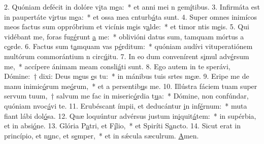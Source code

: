 2. Quóniam defécit in dolóre v\uline{i}ta m\uline{e}a:~* et anni mei n gem\uline{í}tibus.
3. Infirmáta est in paupertáte v\uline{i}rtus m\uline{e}a:~* et ossa mea cnturb\uline{á}ta sunt.
4. Super omnes inimícos meos factus sum oppróbrium et vicínis m\uline{e}is v\uline{a}lde:~* et timor ntis m\uline{e}is.
5. Qui vidébant me, foras fug\uline{é}runt \uline{a} me:~* oblivióni datus sum, tamquam mórtus a c\uline{o}rde.
6. Factus sum t\uline{a}mquam vas p\uline{é}rditum:~* quóniam audívi vituperatiónem multórum commorántium n circ\uline{ú}itu.
7. In eo dum convenírent s\uline{i}mul adv\uline{é}rsum me,~* accípere ánimam meam consli\uline{á}ti sunt.
8. Ego autem in te sperávi, Dómine:~† dixi: Deus m\uline{e}us \uline{e}s tu:~* in mánibus tuis srtes m\uline{e}æ.
9. Eripe me de manu inimic\uline{ó}rum me\uline{ó}rum,~* et a persentib\uline{u}s me.
10. Illústra fáciem tuam super servum tuum,~† salvum me fac in miseric\uline{ó}rdia t\uline{u}a:~* Dómine, non confúndar, quóniam nvoc\uline{á}vi te.
11. Erubéscant ímpii, et deducántur \uline{i}n inf\uline{é}rnum:~* muta fiant lábi dol\uline{ó}sa.
12. Quæ loquúntur advérsus justum in\uline{i}quit\uline{á}tem:~* in supérbia, et in absi\uline{ó}ne.
13. Glória P\uline{a}tri, et F\uline{í}lio,~* et Spiríti S\uline{a}ncto.
14. Sicut erat in princípio, et n\uline{u}nc, et s\uline{e}mper,~* et in sǽcula sæculrum. \uline{A}men.
